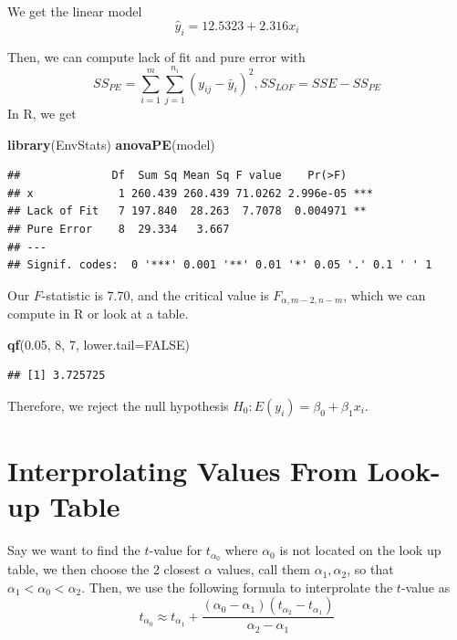 \documentclass[
  11pt,
]{article}
\newenvironment{Shaded}{\begin{snugshade}}{\end{snugshade}}
\newcommand{\AttributeTok}[1]{\textcolor[rgb]{0.13,0.29,0.53}{#1}}
\newcommand{\ConstantTok}[1]{\textcolor[rgb]{0.56,0.35,0.01}{#1}}
\newcommand{\DecValTok}[1]{\textcolor[rgb]{0.00,0.00,0.81}{#1}}
\newcommand{\FloatTok}[1]{\textcolor[rgb]{0.00,0.00,0.81}{#1}}
\newcommand{\FunctionTok}[1]{\textcolor[rgb]{0.13,0.29,0.53}{\textbf{#1}}}
\newcommand{\NormalTok}[1]{#1}
\begin{document}
We get the linear model \[\hat{y}_i = 12.5323 + 2.316x_i\]

Then, we can compute lack of fit and pure error with
\[SS_{PE} = \sum_{i=1}^m\sum_{j=1}^{n_i} (y_{ij} - \bar{y}_i)^2, SS_{LOF} = SSE - SS_{PE}\]
In R, we get

\begin{Shaded}
\begin{Highlighting}[]
\FunctionTok{library}\NormalTok{(EnvStats)}
\FunctionTok{anovaPE}\NormalTok{(model)}
\end{Highlighting}
\end{Shaded}

\begin{verbatim}
##              Df  Sum Sq Mean Sq F value    Pr(>F)    
## x             1 260.439 260.439 71.0262 2.996e-05 ***
## Lack of Fit   7 197.840  28.263  7.7078  0.004971 ** 
## Pure Error    8  29.334   3.667                      
## ---
## Signif. codes:  0 '***' 0.001 '**' 0.01 '*' 0.05 '.' 0.1 ' ' 1
\end{verbatim}

Our \(F\)-statistic is 7.70, and the critical value is
\(F_{\alpha, m-2, n-m}\), which we can compute in R or look at a table.

\begin{Shaded}
\begin{Highlighting}[]
\FunctionTok{qf}\NormalTok{(}\FloatTok{0.05}\NormalTok{, }\DecValTok{8}\NormalTok{, }\DecValTok{7}\NormalTok{, }\AttributeTok{lower.tail=}\ConstantTok{FALSE}\NormalTok{)}
\end{Highlighting}
\end{Shaded}

\begin{verbatim}
## [1] 3.725725
\end{verbatim}

Therefore, we reject the null hypothesis
\(H_0: E(y_i) = \beta_0 + \beta_1x_i\).

\section{Interprolating Values From Look-up
Table}\label{interprolating-values-from-look-up-table}

Say we want to find the \(t\)-value for \(t_{\alpha_0}\) where
\(\alpha_0\) is not located on the look up table, we then choose the 2
closest \(\alpha\) values, call them \(\alpha_1, \alpha_2\), so that
\(\alpha_1 < \alpha_0 < \alpha_2\). Then, we use the following formula
to interprolate the \(t\)-value as
\[t_{\alpha_0} \approx t_{\alpha_1} + \frac{(\alpha_0 - \alpha_1)(t_{\alpha_2} - t_{\alpha_1})}{\alpha_2 - \alpha_1}\]
\end{document}
